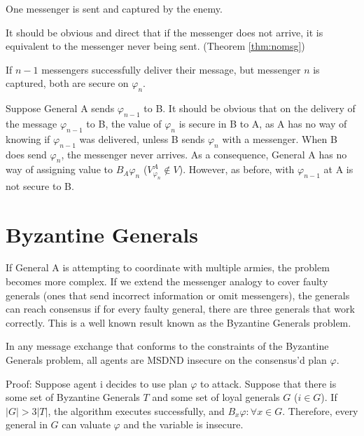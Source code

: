 \begin{case}
One messenger is sent and captured by the enemy.
\end{case}

It should be obvious and direct that if the messenger does not arrive, it is equivalent to the messenger never being sent. (Theorem \ref{thm:nomsg})

\begin{case}
If $n-1$ messengers successfully deliver their message, but messenger $n$ is captured, both are secure on $\varphi_{n}$.
\end{case}

Suppose General A sends $\varphi_{n-1}$ to B. It should be obvious that on the delivery of the message $\varphi_{n-1}$ to B, the value of $\varphi_{n}$ is secure in B to A, as A has no way of knowing if $\varphi_{n-1}$ was delivered, unless B sends $\varphi_{n}$ with a messenger. When B does send $\varphi_{n}$, the messenger never arrives. As a consequence, General A has no way of assigning value to $B_A \varphi_n$ ($V_{\varphi_n}^A \not \in V$). However, as before, with $\varphi_{n-1}$ at A is not secure to B.



\section{Byzantine Generals}

If General A is attempting to coordinate with multiple armies, the problem becomes more complex. If we extend the messenger analogy to cover faulty generals (ones that send incorrect information or omit messengers), the generals can reach consensus if for every faulty general, there are three generals that work correctly. This is a well known result known as the Byzantine Generals problem.

\begin{thm}
In any message exchange that conforms to the constraints of the Byzantine Generals problem, all agents are MSDND insecure on the consensus'd plan $\varphi$.
\end{thm}

Proof: Suppose agent i decides to use plan $\varphi$ to attack. Suppose that there is some set of Byzantine Generals $T$ and some set of loyal generals $G$ ($i \in G$). If $|G| > 3|T|$, the algorithm executes successfully, and $B_x \varphi : \forall x \in G $. Therefore, every general in $G$ can valuate $\varphi$ and the variable is insecure.

